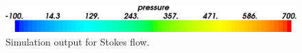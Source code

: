 \begin{figure}
\includegraphics[scale=0.25]{figures/stokes-fluid-colorbar.eps}
\caption{Simulation output for Stokes flow.}
\label{FLUID OUTPUT2}
\end{figure}
